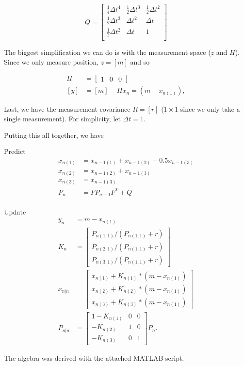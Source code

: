 \documentclass[11pt]{article}
\begin{document}
\[ Q =
	\begin{bmatrix}
		\frac14 \Delta t^4 & \frac12 \Delta t^3 & \frac12 \Delta t^2 \\
		\frac12 \Delta t^3 &         \Delta t^2 &         \Delta t \\
		\frac12 \Delta t^2 &         \Delta t   &                1 \\
	\end{bmatrix}
\]

The biggest simplification we can do is with the measurement space ($z$ and $H$). Since we only measure position, $z = [m]$ and so

\begin{align*}
	H   &= \begin{bmatrix} 1 & 0 & 0 \end{bmatrix} \\
	[y] &= [m] - H x_n = (m - x_{n(1)}),
\end{align*}

Last, we have the measurement covariance $R = [r]$ ($1 \times 1$ since we only take a single measurement). For simplicity, let $\Delta t = 1$.

\clearpage
Putting this all together, we have

Predict
\begin{align*}
	x_{n(1)} &= x_{n-1(1)} + x_{n-1(2)} + 0.5 x_{n-1(3)} \\
	x_{n(2)} &= x_{n-1(2)} + x_{n-1(3)} \\
	x_{n(3)} &= x_{n-1(3)} \\
	P_n &= F P_{n-1} F^T + Q \\
\end{align*}

Update
\begin{align*}
	y_n &= m - x_{n(1)} \\
	K_n &= \begin{bmatrix}
		  P_{n(1,1)} / (P_{n(1,1)} + r) \\
		  P_{n(2,1)} / (P_{n(1,1)} + r) \\
		  P_{n(3,1)} / (P_{n(1,1)} + r)
	\end{bmatrix} \\
	x_{n|n} &= \begin{bmatrix}
		x_{n(1)} + K_{n(1)}*(m - x_{n(1)}) \\
		x_{n(2)} + K_{n(2)}*(m - x_{n(1)}) \\
		x_{n(3)} + K_{n(3)}*(m - x_{n(1)})
	\end{bmatrix} \\
	P_{n|n} &= \begin{bmatrix}
		1 - K_{n(1)}  &  0 & 0 \\
		   - K_{n(2)} &  1 & 0 \\
		   - K_{n(3)} &  0 & 1
	\end{bmatrix} P_n.
\end{align*}

The algebra was derived with the attached MATLAB script.
\end{document}
